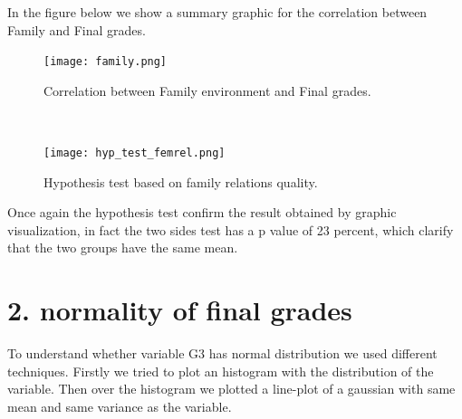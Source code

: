 \documentclass[a4paper, 11pt]{report}
\theoremstyle{definition}
\numberwithin{equation}{section}		%
\numberwithin{table}{section}				%
\begin{document}
\begin{itemize}
In the figure below we show a summary graphic for the correlation between Family and Final grades.
\begin{figure}[ht]\centering
\texttt{[image: family.png]}
\caption{Correlation between Family environment and Final grades.}
\end{figure}
\\[0.2in]
\begin{figure}[ht!]\centering
\texttt{[image: hyp\_test\_femrel.png]}
\caption{Hypothesis test based on family relations quality.}
\end{figure}

Once again the hypothesis test confirm the result obtained by graphic visualization, in fact the two sides test has a p value of 23 percent, 
which clarify that the two groups have the same mean.
\end{itemize}



\newpage
\section*{2. normality of final grades}

To understand whether variable G3 has normal distribution we used different
techniques. Firstly we tried to plot an histogram with the distribution of the variable. Then over the histogram we plotted a line-plot of a gaussian with same mean and same variance as the variable.
\end{document}
